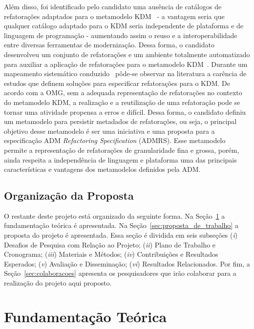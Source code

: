 \documentclass[12pt]{article}
\begin{document}
Além disso, foi identificado pelo candidato uma ausência de catálogos de refatorações adaptados para o metamodelo KDM~\cite{durelli_systematic_mapping} - a vantagem seria que qualquer catálogo adaptado para o KDM seria independente de plataforma e de linguagem de programação - aumentando assim o reuso e a interoperabilidade entre diversas ferramentas de modernização. Dessa forma, o candidato desenvolveu um conjunto de refatorações e um ambiente totalmente automatizado para auxiliar a aplicação de refatorações para o metamodelo KDM~\cite{durelli_catalogo, durelli_VEM_ferramenta}. Durante um mapeamento sistemático conduzido~\cite{durelli_systematic_mapping} pôde-se observar na literatura a carência de estudos que definem soluções para especificar refatorações para o KDM. De acordo com a OMG, sem a adequada representação de refatorações no contexto do metamodelo KDM, a realização e a reutilização de uma refatoração pode se tornar uma atividade propensa a erros e difícil. Dessa forma, o candidato definiu um metamodelo para persistir metadados de refatorações, ou seja, o principal objetivo desse metamodelo é ser uma iniciativa e uma proposta para a especificação ADM \textit{Refactoring Specification} (ADMRS). Esse metamodelo permite a representação de refatorações de granularidade fina e grossa, porém, ainda respeita a independência de linguagem e plataforma uma das principais características e vantagens dos metamodelos definidos pela ADM. 

\subsection{Organização da Proposta}

O restante deste projeto está organizado da seguinte forma. Na Seção~\ref{sec:fundamentacao_teorica} a fundamentação teórica é apresentada. Na Seção~\ref{sec:proposta_de_trabalho} a proposta do projeto é apresentada. Essa seção é dividida em seis subseções (\textit{i}) Desafios de Pesquisa com Relação ao Projeto; (\textit{ii}) Plano de Trabalho e Cronograma; (\textit{iii}) Materiais e Métodos; (\textit{iv}) Contribuições e Resultados Esperados; (\textit{v}) Avaliação e Disseminação; (\textit{vi}) Resultados Relacionados. Por fim, a Seção~\ref{sec:colaboracoes} apresenta os pesquisadores que irão colaborar para a realização do projeto aqui proposto.

\section{Fundamentação Teórica}\label{sec:fundamentacao_teorica}
\end{document}
